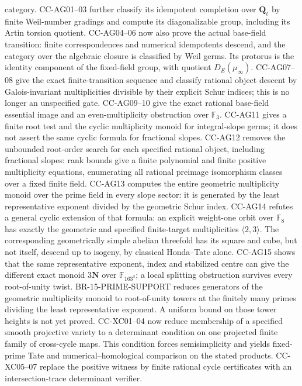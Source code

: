 \begin{description}[style=nextline,leftmargin=0pt]
category. CC-AG01--03 further classify its idempotent completion over
$\overline{\mathbf Q}_\ell$ by finite Weil-number gradings and
compute its diagonalizable group, including its Artin torsion quotient. CC-AG04--06 now also prove the
actual base-field transition: finite correspondences and numerical
idempotents descend, and the category over the algebraic closure is
classified by Weil germs. Its protorus is the identity component of
the fixed-field group, with quotient $D_E(\mu_\infty)$.
CC-AG07--08 give the exact finite-transition sequence and classify
rational object descent by Galois-invariant multiplicities divisible
by their explicit Schur indices; this is no longer an unspecified gate.
CC-AG09--10 give the exact rational base-field essential image and an
even-multiplicity obstruction over $\mathbb F_3$. CC-AG11 gives a
finite root test and the cyclic multiplicity monoid for integral-slope
germs; it does not assert the same cyclic formula for fractional slopes.
CC-AG12 removes the unbounded root-order search for each specified
rational object, including fractional slopes: rank bounds give a finite
polynomial and finite positive multiplicity equations, enumerating all
rational preimage isomorphism classes over a fixed finite field.
CC-AG13 computes the entire geometric multiplicity monoid over the
prime field in every slope sector: it is generated by the least
representative exponent divided by the geometric Schur index.
CC-AG14 refutes a general cyclic extension of that formula: an explicit
weight-one orbit over $\mathbb F_8$ has exactly the geometric and
specified finite-target multiplicities $\langle2,3\rangle$. The
corresponding geometrically simple abelian threefold has its square
and cube, but not itself, descend up to isogeny, by classical
Honda--Tate alone. CC-AG15 shows that the same representative exponent,
index and stabilized centre can give the different exact monoid
$3\mathbf N$ over $\mathbb F_{163^3}$; a local splitting obstruction
survives every root-of-unity twist. BR-15-PRIME-SUPPORT reduces generators
of the geometric multiplicity monoid to root-of-unity towers at the
finitely many primes dividing the least representative exponent. A
uniform bound on those tower heights is not yet proved.
CC-XC01--04 now reduce membership of a specified smooth projective
variety to a determinant condition on one projected finite family
of cross-cycle maps. This condition forces semisimplicity and yields
fixed-prime Tate and numerical--homological comparison on the stated
products. CC-XC05--07 replace the positive witness by finite rational
cycle certificates with an intersection-trace determinant verifier.

\end{description}
